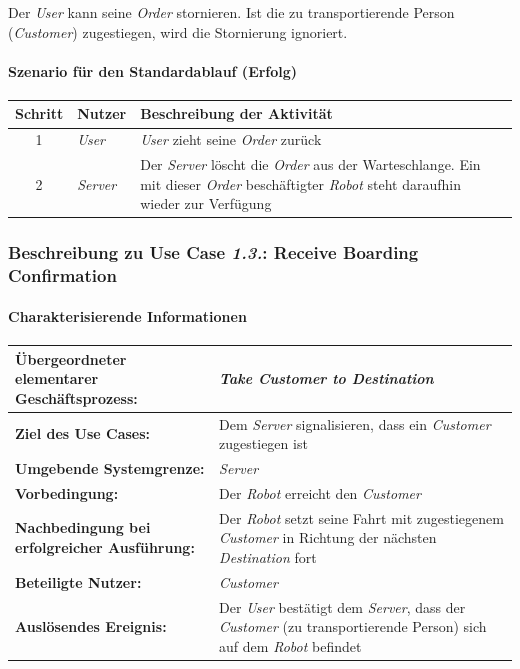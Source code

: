 			Der \emph{User} kann seine \emph{Order} stornieren. Ist die zu transportierende Person (\emph{Customer}) zugestiegen, wird die Stornierung ignoriert.
			
			\paragraph*{Szenario für den Standardablauf (Erfolg)}
			
			\begin{table}[H]
				\centering
				\begin{tabularx}{\textwidth}{|c|p{2cm}|X|}
					\hline
					Schritt & Nutzer & Beschreibung der Aktivität \\ \hline
					1 & \emph{User} & \emph{User} zieht seine \emph{Order} zurück \\
					2 & \emph{Server} & Der \emph{Server} löscht die \emph{Order} aus der Warteschlange. Ein mit dieser \emph{Order} beschäftigter \emph{Robot} steht daraufhin wieder zur Verfügung \\
					\hline
				\end{tabularx}
			\end{table}
		
			
			\pagebreak
	
			\subsubsection{Beschreibung zu Use Case \emph{1.3.}: Receive Boarding Confirmation}
				\paragraph*{Charakterisierende Informationen}
				
				\begin{table}[H]
					\centering
					\begin{tabularx}{\textwidth}{|p{5cm}|X|}
						\hline
						\textbf{Übergeordneter elementarer Geschäftsprozess:} & \emph{Take Customer to Destination} \\ \hline
						\textbf{Ziel des Use Cases:} & Dem \emph{Server} signalisieren, dass ein \emph{Customer} zugestiegen ist \\ \hline
						\textbf{Umgebende Systemgrenze:} & \emph{Server} \\ \hline
						\textbf{Vorbedingung:} & Der \emph{Robot} erreicht den \emph {Customer} \\ \hline
						\textbf{Nachbedingung bei erfolgreicher Ausführung:} & Der \emph{Robot} setzt seine Fahrt mit zugestiegenem \emph{Customer} in Richtung der nächsten \emph{Destination} fort \\ \hline
						\textbf{Beteiligte Nutzer:} & \emph{Customer} \\ \hline
						\textbf{Auslösendes Ereignis:} & Der \emph{User} bestätigt dem \emph{Server}, dass der \emph{Customer} (zu transportierende Person) sich auf dem \emph{Robot} befindet \\
						\hline
					\end{tabularx}
				\end{table}
				
